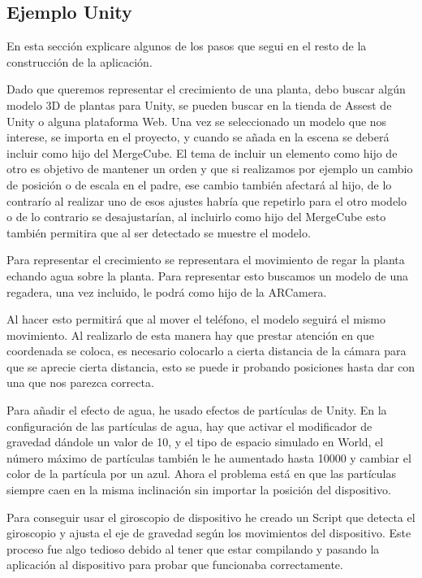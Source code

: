 \subsection{Ejemplo Unity}
En esta sección explicare algunos de los pasos que segui en el resto de la construcción de la aplicación.

Dado que queremos representar el crecimiento de una planta, debo buscar algún modelo 3D de plantas para Unity, se pueden buscar en la tienda de Assest de Unity o alguna plataforma Web. Una vez se seleccionado un modelo que nos interese, se importa en el proyecto, y cuando se añada en la escena se deberá incluir como hijo del MergeCube. El tema de incluir un elemento como hijo de otro es objetivo de mantener un orden y que si realizamos por ejemplo un cambio de posición o de escala en el padre, ese cambio también afectará al hijo, de lo contrarío al realizar uno de esos ajustes habría que repetirlo para el otro modelo o de lo contrario se desajustarían, al incluirlo como hijo del MergeCube esto también permitira que al ser detectado se muestre el modelo.

Para representar el crecimiento se representara el movimiento de regar la planta echando agua sobre la planta. Para representar esto buscamos un modelo de una regadera, una vez incluido, le podrá como hijo de la ARCamera.

Al hacer esto permitirá que al mover el teléfono, el modelo seguirá el mismo movimiento.
Al realizarlo de esta manera hay que prestar atención en que coordenada se coloca, es necesario colocarlo a cierta distancia de la cámara para que se aprecie cierta distancia, esto se puede ir probando posiciones hasta dar con una que nos parezca correcta.

Para añadir el efecto de agua, he usado efectos de partículas de Unity. En la configuración de las partículas de agua, hay que activar el modificador de gravedad dándole un valor de 10, y el tipo de espacio simulado en World, el número máximo de partículas también le he aumentado hasta 10000 y cambiar el color de la partícula por un azul. Ahora el problema está en que las partículas siempre caen en la misma inclinación sin importar la posición del dispositivo. 

Para conseguir usar el giroscopio de dispositivo he creado un Script que detecta el giroscopio y ajusta el eje de gravedad según los movimientos del dispositivo. Este proceso fue algo tedioso debido al tener que estar compilando y pasando la aplicación al dispositivo para probar que funcionaba correctamente.

